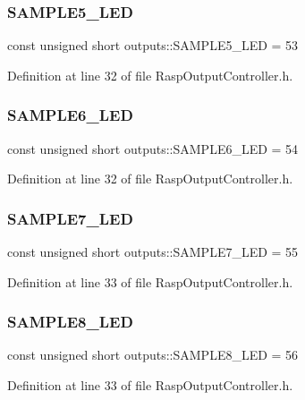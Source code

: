 \subsubsection{\texorpdfstring{S\+A\+M\+P\+L\+E5\+\_\+\+L\+ED}{SAMPLE5\_LED}}
{\footnotesize\ttfamily const unsigned short outputs\+::\+S\+A\+M\+P\+L\+E5\+\_\+\+L\+ED = 53}



Definition at line 32 of file Rasp\+Output\+Controller.\+h.

\mbox{\label{namespaceoutputs_a7bdee2eb9fc676ac7edb9582334be15a}} 
\subsubsection{\texorpdfstring{S\+A\+M\+P\+L\+E6\+\_\+\+L\+ED}{SAMPLE6\_LED}}
{\footnotesize\ttfamily const unsigned short outputs\+::\+S\+A\+M\+P\+L\+E6\+\_\+\+L\+ED = 54}



Definition at line 32 of file Rasp\+Output\+Controller.\+h.

\mbox{\label{namespaceoutputs_a3d438bc8ce91fb825bf2da7834ac639e}} 
\subsubsection{\texorpdfstring{S\+A\+M\+P\+L\+E7\+\_\+\+L\+ED}{SAMPLE7\_LED}}
{\footnotesize\ttfamily const unsigned short outputs\+::\+S\+A\+M\+P\+L\+E7\+\_\+\+L\+ED = 55}



Definition at line 33 of file Rasp\+Output\+Controller.\+h.

\mbox{\label{namespaceoutputs_ac6e07c06d1d512716e6309db54648440}} 
\subsubsection{\texorpdfstring{S\+A\+M\+P\+L\+E8\+\_\+\+L\+ED}{SAMPLE8\_LED}}
{\footnotesize\ttfamily const unsigned short outputs\+::\+S\+A\+M\+P\+L\+E8\+\_\+\+L\+ED = 56}



Definition at line 33 of file Rasp\+Output\+Controller.\+h.

